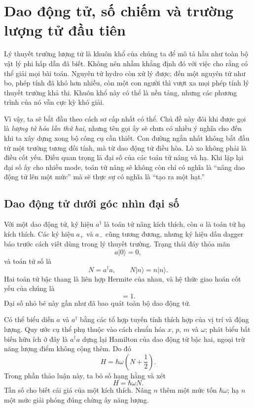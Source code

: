 \chapter{Dao động tử, số chiếm và trường lượng tử đầu tiên}

Lý thuyết trường lượng tử là khuôn khổ của chúng ta để mô tả hầu như toàn bộ vật lý phi hấp dẫn đã biết. Không nên nhầm khẳng định đó với việc cho rằng có thể giải mọi bài toán. Nguyên tử hydro còn xử lý được; đến một nguyên tử như bo, phép tính đã khó hơn nhiều, còn một con người thì vượt xa mọi phép tính lý thuyết trường khả thi. Khuôn khổ này có thể là nền tảng, nhưng các phương trình của nó vẫn cực kỳ khó giải.

Vì vậy, ta sẽ bắt đầu theo cách sơ cấp nhất có thể. Chủ đề này đôi khi được gọi là \emph{lượng tử hóa lần thứ hai}, nhưng tên gọi ấy sẽ chưa có nhiều ý nghĩa cho đến khi ta xây dựng xong bộ công cụ cần thiết. Con đường ngắn nhất không bắt đầu từ một trường tương đối tính, mà từ dao động tử điều hòa. Lò xo không phải là điều cốt yếu. Điều quan trọng là đại số của các toán tử nâng và hạ. Khi lặp lại đại số ấy cho nhiều mode, toán tử nâng sẽ không còn chỉ có nghĩa là ``nâng dao động tử lên một mức'' mà sẽ thực sự có nghĩa là ``tạo ra một hạt.''

\section{Dao động tử dưới góc nhìn đại số}

Với một dao động tử, ký hiệu \(a^\dagger\) là toán tử nâng kích thích, còn \(a\) là toán tử hạ kích thích. Các ký hiệu \(a_+\) và \(a_-\) cũng tương đương, nhưng ký hiệu dấu dagger báo trước cách viết dùng trong lý thuyết trường. Trạng thái đáy thỏa mãn
\begin{equation}
a|0\rangle=0,
\end{equation}
và toán tử số là
\begin{equation}
N=a^\dagger a,
\qquad
N|n\rangle=n|n\rangle.
\end{equation}
Hai toán tử bậc thang là liên hợp Hermite của nhau, và hệ thức giao hoán cốt yếu của chúng là
\begin{equation}
[a,a^\dagger]=1.
\label{eq:l06-single-commutator}
\end{equation}
Đại số nhỏ bé này gần như đã bao quát toàn bộ dao động tử.

Có thể biểu diễn \(a\) và \(a^\dagger\) bằng các tổ hợp tuyến tính thích hợp của vị trí và động lượng. Quy ước cụ thể phụ thuộc vào cách chuẩn hóa \(x\), \(p\), \(m\) và \(\omega\); phát biểu bất biến hữu ích ở đây là \(a^\dagger a\) dựng lại Hamilton của dao động tử bậc hai, ngoại trừ năng lượng điểm không cộng thêm. Do đó
\begin{equation}
H=\hbar\omega\left(N+\frac12\right).
\end{equation}
Trong phần thảo luận này, ta bỏ số hạng hằng và xét
\begin{equation}
H=\hbar\omega N.
\label{eq:l06-one-oscillator-hamiltonian}
\end{equation}
Tần số cho biết cái giá của một kích thích. Nâng \(n\) thêm một mức tốn \(\hbar\omega\); hạ \(n\) một mức giải phóng đúng chừng ấy năng lượng.

